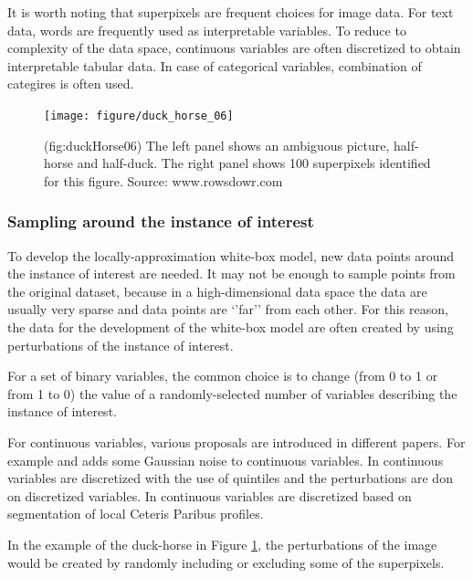 \documentclass[12pt,]{krantz}
\begin{document}
It is worth noting that superpixels are frequent choices for image data. For text data, words are frequently used as interpretable variables. To reduce to complexity of the data space, continuous variables are often discretized to obtain interpretable tabular data. In case of categorical variables, combination of categires is often used.

\begin{figure}

{\centering \texttt{[image: figure/duck\_horse\_06]} 

}

\caption{(fig:duckHorse06) The left panel shows an ambiguous picture, half-horse and half-duck. The right panel shows 100 superpixels identified for this figure. Source: www.rowsdowr.com}\label{fig:duckHorse06}
\end{figure}

\hypertarget{sampling-around-the-instance-of-interest}{%
\subsubsection{Sampling around the instance of interest}\label{sampling-around-the-instance-of-interest}}

To develop the locally-approximation white-box model, new data points around the instance of interest are needed. It may not be enough to sample points from the original dataset, because in a high-dimensional data space the data are usually very sparse and data points are `'far'' from each other. For this reason, the data for the development of the white-box model are often created by using perturbations of the instance of interest.

For a set of binary variables, the common choice is to change (from 0 to 1 or from 1 to 0) the value of a randomly-selected number of variables describing the instance of interest.

For continuous variables, various proposals are introduced in different papers. For example \citep{imlPackage} and \citep{molnar2019} adds some Gaussian noise to continuous variables. In \citep{limePackage} continuous variables are discretized with the use of quintiles and the perturbations are don on discretized variables. In \citep{localModelPackage} continuous variables are discretized based on segmentation of local Ceteris Paribus profiles.

In the example of the duck-horse in Figure \ref{fig:duckHorse06}, the perturbations of the image would be created by randomly including or excluding some of the superpixels.
\end{document}

